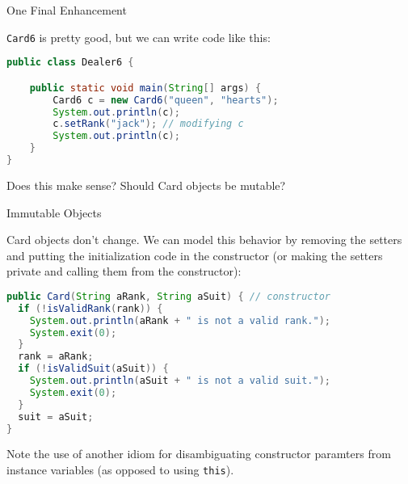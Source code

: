 \documentclass{beamer}
\begin{document}
\begin{frame}[fragile]{One Final Enhancement}

{\tt Card6} is pretty good, but we can write code like this:

\begin{lstlisting}[language=Java]
public class Dealer6 {

    public static void main(String[] args) {
        Card6 c = new Card6("queen", "hearts");
        System.out.println(c);
        c.setRank("jack"); // modifying c
        System.out.println(c);
    }
}
\end{lstlisting}
Does this make sense?  Should Card objects be mutable?

\end{frame}



\begin{frame}[fragile]{Immutable Objects}

\vspace{-.05in}
Card objects don't change.  We can model this behavior by removing the setters and putting the initialization code in the constructor (or making the setters private and calling them from the constructor):

\begin{lstlisting}[language=Java]
public Card(String aRank, String aSuit) { // constructor
  if (!isValidRank(rank)) {
    System.out.println(aRank + " is not a valid rank.");
    System.exit(0);
  }
  rank = aRank;
  if (!isValidSuit(aSuit)) {
    System.out.println(aSuit + " is not a valid suit.");
    System.exit(0);
  }
  suit = aSuit;
}
\end{lstlisting}
\vspace{-.05in}
\small Note the use of another idiom for disambiguating constructor paramters from instance variables (as opposed to using {\tt this}).\normalsize

\end{frame}
\end{document}

